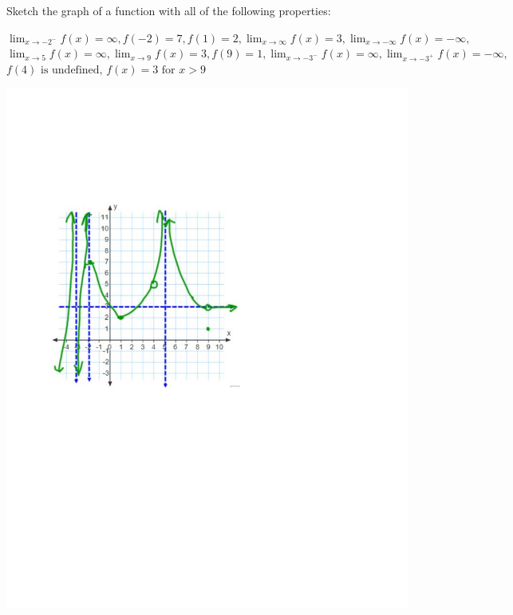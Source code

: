 \documentclass[handout,nooutcomes]{ximera}
\begin{document}
\begin{problem}	
Sketch the graph of a function with all of the following properties:

	$\lim_{x \to -2^-} f(x) = \infty, 
	f(-2) = 7, 
	f(1) = 2, 
	\lim_{x \to \infty} f(x) = 3, 
	\lim_{x \to -\infty} f(x) = -\infty,$
\newline 
	$\lim_{x \to 5} f(x) = \infty, 
	\lim_{x \to 9} f(x) = 3,  
	f(9) = 1,  
	\lim_{x \to -3^-} f(x) = \infty,  
	\lim_{x \to -3^+} f(x) = -\infty,$
\newline  
	$f(4) \text{ is undefined, }
	f(x) = 3 \text{ for } x>9  $
	
		\begin{freeResponse}
			\begin{image}
			\includegraphics[trim= 100 360 300 175]{Figure2.pdf}
			\end{image}
		\end{freeResponse}
\end{problem}
\end{document}
